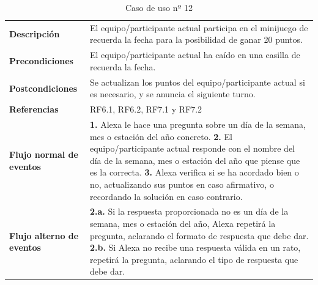 \begin{table}[H]
	\centering
	\begin{tabular}{|p{3cm}|p{12cm}|}
		\hline
		\rowcolor{lightgray}
		\multicolumn{2}{|c|}{\textbf{CU12}: Minijuego recuerda la fecha} \\
		\hline
		\textbf{Descripción} & El equipo/participante actual participa en el minijuego de recuerda la fecha para la posibilidad de ganar 20 puntos. \vspace{0.2cm} \\
		\hline
		\textbf{Precondiciones} & El equipo/participante actual ha caído en una casilla de recuerda la fecha. \vspace{0.2cm} \\
		\hline
		\textbf{Postcondiciones} & Se actualizan los puntos del equipo/participante actual si es necesario, y se anuncia el siguiente turno. \vspace{0.2cm} \\
		\hline
		\textbf{Referencias} & RF6.1, RF6.2, RF7.1 y RF7.2 \vspace{0.2cm} \\
		\hline
		\textbf{Flujo normal de eventos} &
		\textbf{1.} Alexa le hace una pregunta sobre un día de la semana, mes o estación del año concreto. \newline
		\vspace{0.2cm}
		\textbf{2.} El equipo/participante actual responde con el nombre del día de la semana, mes o estación del año que piense que es la correcta. \newline
		\vspace{0.2cm}
		\textbf{3.} Alexa verifica si se ha acordado bien o no, actualizando sus puntos en caso afirmativo, o recordando la solución en caso contrario. \newline
		\vspace{0.2cm} \\
		\hline
		\textbf{Flujo alterno de eventos} &
		\textbf{2.a.} Si la respuesta proporcionada no es un día de la semana, mes o estación del año, Alexa repetirá la pregunta, aclarando el formato de respuesta que debe dar. \newline
		\vspace{0.2cm} 
		\textbf{2.b.} Si Alexa no recibe una respuesta válida en un rato, repetirá la pregunta, aclarando el tipo de respuesta que debe dar.
		\vspace{0.2cm} \\
		\hline
	\end{tabular}
	\caption{Caso de uso nº 12}
	\label{tab:CU12}
\end{table}

